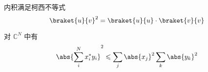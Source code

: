 
内积满足柯西不等式
\begin{equation}
\braket{u}{v}^2 = \braket{u}{u} \cdot \braket{v}{v}
\end{equation}

对 $\mathbb C^N$ 中有
\begin{equation}
\abs{\sum_i^N x_i^* y_i}^2 \leqslant \sum_j \abs{x_j}^2 \sum_k \abs{y_k}^2
\end{equation}
